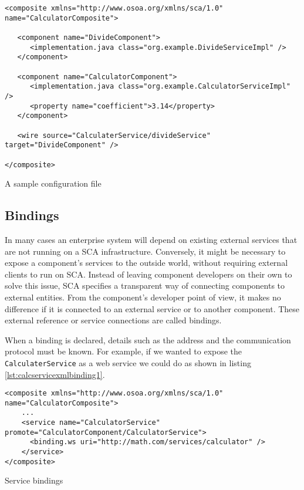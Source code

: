 \begin{listing}
\begin{verbatim}
<composite xmlns="http://www.osoa.org/xmlns/sca/1.0" name="CalculatorComposite">

   <component name="DivideComponent">
      <implementation.java class="org.example.DivideServiceImpl" />
   </component>

   <component name="CalculatorComponent">
      <implementation.java class="org.example.CalculatorServiceImpl" />
      <property name="coefficient">3.14</property>
   </component>
   
   <wire source="CalculaterService/divideService" target="DivideComponent" />

</composite>
\end{verbatim}
\caption{A sample configuration file}
\label{lst:calcservicexmlwires}
\end{listing}

\subsection{Bindings}

In many cases an enterprise system will depend on existing external services that are not running on a SCA infrastructure.
Conversely, it might be necessary to expose a component's services to the outside world, without requiring external clients
to run on SCA. Instead of leaving component developers on their own to solve this issue, SCA specifies
a transparent way of connecting components to external entities. From the component's developer point of view, it makes
no difference if it is connected to an external service or to another component. These external reference or service
connections are called bindings.

When a binding is declared, details such as the address and the communication protocol must be known. For example, if we
wanted to expose the \texttt{CalculaterService} as a web service we could do as shown in listing \ref{lst:calcservicexmlbinding1}.

\begin{listing}
\begin{verbatim}
<composite xmlns="http://www.osoa.org/xmlns/sca/1.0" name="CalculatorComposite">
    ...
    <service name="CalculatorService" promote="CalculatorComponent/CalculatorService">
      <binding.ws uri="http://math.com/services/calculator" />
    </service>
</composite>
\end{verbatim}
\caption{Service bindings}
\label{lst:calcservicexmlbinding1}
\end{listing}

